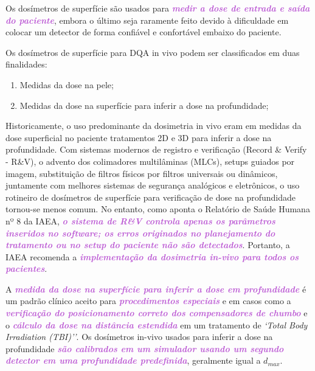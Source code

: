 \documentclass[11pt,a4paper]{article}
\begin{document}
	Os dosímetros de superfície são usados para \textcolor{MediumOrchid}{\textbf{\textit{medir a dose de entrada e saída do paciente}}}, embora o último seja raramente feito devido à dificuldade em colocar um detector de forma confiável e confortável embaixo do paciente.

	Os dosímetros de superfície para DQA in vivo podem ser classificados em duas finalidades:

	\begin{enumerate}[label=\textcolor{CarnationPink}{\arabic*${}^\circ $}]
		\item Medidas da dose na pele;
		\item Medidas da dose na superfície para inferir a dose na profundidade;
	\end{enumerate}

	Historicamente, o uso predominante da dosimetria in vivo eram em medidas da dose superficial no paciente tratamentos 2D e 3D para inferir a dose na profundidade. Com sistemas modernos de registro e verificação (Record \& Verify - R\&V), o advento dos colimadores multilâminas (MLCs), setups guiados por imagem, substituição de filtros físicos por filtros universais ou dinâmicos, juntamente com melhores sistemas de segurança analógicos e eletrônicos, o uso rotineiro de dosímetros de superfície para verificação de dose na profundidade tornou-se menos comum. No entanto, como aponta o Relatório de Saúde Humana nº 8 da IAEA, \textcolor{MediumOrchid}{\textbf{\textit{o sistema de R\&V controla apenas os parâmetros inseridos no software; os erros originados no planejamento do tratamento ou no setup do paciente não são detectados}}}. Portanto, a IAEA recomenda a \textcolor{MediumOrchid}{\textbf{\textit{implementação da dosimetria in-vivo para todos os pacientes}}}.

	A \textcolor{MediumOrchid}{\textbf{\textit{medida da dose na superfície para inferir a dose em profundidade}}} é um padrão clínico aceito para \textcolor{MediumOrchid}{\textbf{\textit{procedimentos especiais}}} e em casos como a \textcolor{MediumOrchid}{\textbf{\textit{verificação do posicionamento correto dos compensadores de chumbo}}} e o\textcolor{MediumOrchid}{\textbf{\textit{ cálculo da dose na distância estendida}}} em um tratamento de \textit{`Total Body Irradiation (TBI)''}. Os dosímetros in-vivo usados para inferir a dose na profundidade \textcolor{MediumOrchid}{\textbf{\textit{são calibrados em um simulador usando um segundo detector em uma profundidade predefinida}}}, geralmente igual a $d_{max}$. 
	
\end{document}
